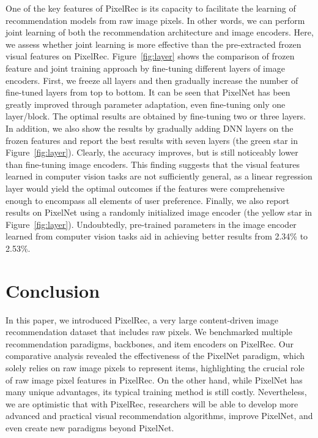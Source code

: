 \documentclass[sigconf]{acmart}
\begin{document}
One of the key features of PixelRec is its capacity to facilitate the learning of recommendation models from raw image pixels. In other words, we can perform  joint learning of both the recommendation architecture and image encoders. 
Here, we assess whether joint learning  is more effective than the pre-extracted frozen visual features on PixelRec.
Figure~\ref{fig:layer} shows the comparison of frozen feature and joint training approach by fine-tuning different layers of image encoders. First, we freeze all layers and then gradually increase the number of fine-tuned layers from top to bottom. It can be seen that PixelNet has been greatly improved through parameter adaptation, even  fine-tuning only one layer/block. 
The optimal results are obtained by fine-tuning two or three layers.  In addition, we also show the results by gradually adding DNN  layers  on the frozen features and report the best results with seven layers (the green star in Figure~\ref{fig:layer}). Clearly, the accuracy improves, but is still noticeably  lower than fine-tuning image encoders. 
This finding suggests that the visual features learned in computer vision tasks are not sufficiently general, as a linear regression layer would yield the optimal outcomes if the features were comprehensive enough to encompass all elements of user preference. Finally, we also report results on PixelNet using a randomly initialized image encoder (the yellow star in Figure~\ref{fig:layer}). Undoubtedly, pre-trained parameters in the image encoder learned from  computer vision tasks  aid in achieving  better results from 2.34\% to 2.53\%.



\section{Conclusion}
In this paper, we introduced PixelRec, a very large content-driven image recommendation dataset that includes raw pixels. We benchmarked multiple recommendation paradigms, backbones, and item encoders on PixelRec. Our comparative analysis revealed the effectiveness of the PixelNet paradigm, which solely relies on raw image pixels to represent items, highlighting the crucial role of raw image pixel features in PixelRec. On the other hand, while PixelNet has many unique advantages, its typical training method is still costly. Nevertheless, we are optimistic that with PixelRec, researchers will be able to develop more advanced and practical visual recommendation algorithms, improve PixelNet, and even create new paradigms beyond PixelNet.
\end{document}
